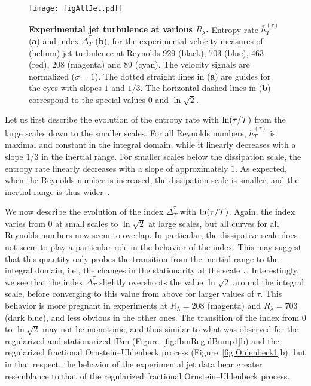 \documentclass[aps,pra,groupedaddress,notitlepage]{revtex4-1}
\begin{document}
\begin{figure}[htb]
\texttt{[image: figAllJet.pdf]}
\caption{{\bf Experimental jet turbulence at various $R_\lambda$.} 
Entropy rate $\bar{h}_T^{(\tau)}$ (\textbf{a}) and index $\bar{\Delta}_T^{\tau}$ (\textbf{b}), for the experimental velocity measures of (helium) jet turbulence at Reynolds 929 (black), 703 (blue), 463 (red), 208 (magenta) and 89 (cyan). The velocity signals are normalized ($\sigma=1$). 
The dotted straight lines in (\textbf{a}) are guides for the eyes with slopes $1$ and $1/3$. 
The horizontal dashed lines in (\textbf{b}) correspond to the special values $0$ and $\ln\sqrt{2}$.
}
\label{fig:jet}
\end{figure}

Let us first describe the evolution of the entropy rate with $\ln(\tau/\cal{T})$ from the large scales down to the smaller scales. 
For all Reynolds numbers, $\bar{h}_T^{(\tau)}$ is maximal and constant in the integral domain, while it  linearly decreases with a slope $1/3$ in the inertial range. For smaller scales below the dissipation scale, the entropy rate linearly  decreases with a slope of approximately $1$. As expected, when the Reynolds number is increased, the dissipation scale is smaller, and the inertial range is thus wider~\cite{Frisch:1995}.

We now describe the evolution of the index $\bar{\Delta}_T^{\tau}$ with $\ln(\tau/\cal{T})$. Again, the index varies from 0 at small scales to $\ln\sqrt{2}$ at large scales, but all curves for all Reynolds numbers now seem to overlap. In particular, the dissipative scale does not seem to play a particular role in the behavior of the index. This may suggest that this quantity only probes the transition from the inertial range to the integral domain, {i.e.}, the changes in the stationarity at the scale $\tau$. Interestingly, we see that the index $\bar{\Delta}_T^{\tau}$ slightly overshoots the value $\ln\sqrt{2}$ around the integral scale, before converging to this value from above for larger values of $\tau$. This behavior is more pregnant in experiments at $R_\lambda=208$ (magenta) and $R_\lambda=703$ (dark blue), and less obvious in the other ones. The transition of the index from $0$ to $\ln\sqrt{2}$ may not be monotonic, and thus similar to what was observed for the regularized and stationarized fBm (Figure~\ref{fig:fbmRegulBump1}b) and the regularized fractional Ornstein--Uhlenbeck process (Figure~\ref{fig:Oulenbeck1}b); but in that respect, the behavior of the experimental jet data bear greater resemblance to  that of the regularized fractional Ornstein--Uhlenbeck process.
\end{document}
